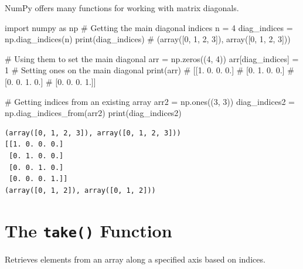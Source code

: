 \documentclass[
  english,
  letterpaper,
  DIV=11,
  numbers=noendperiod]{scrreprt}
\newenvironment{Shaded}{\begin{snugshade}}{\end{snugshade}}
\newcommand{\BuiltInTok}[1]{\textcolor[rgb]{0.00,0.23,0.31}{#1}}
\newcommand{\CommentTok}[1]{\textcolor[rgb]{0.37,0.37,0.37}{#1}}
\newcommand{\DecValTok}[1]{\textcolor[rgb]{0.68,0.00,0.00}{#1}}
\newcommand{\ImportTok}[1]{\textcolor[rgb]{0.00,0.46,0.62}{#1}}
\newcommand{\NormalTok}[1]{\textcolor[rgb]{0.00,0.23,0.31}{#1}}
\newcommand{\OperatorTok}[1]{\textcolor[rgb]{0.37,0.37,0.37}{#1}}
\begin{document}
NumPy offers many functions for working with matrix diagonals.

\begin{Shaded}
\begin{Highlighting}[]
\ImportTok{import}\NormalTok{ numpy }\ImportTok{as}\NormalTok{ np}
\CommentTok{\# Getting the main diagonal indices}
\NormalTok{n }\OperatorTok{=} \DecValTok{4}
\NormalTok{diag\_indices }\OperatorTok{=}\NormalTok{ np.diag\_indices(n)}
\BuiltInTok{print}\NormalTok{(diag\_indices)  }\CommentTok{\# (array([0, 1, 2, 3]), array([0, 1, 2, 3]))}

\CommentTok{\# Using them to set the main diagonal}
\NormalTok{arr }\OperatorTok{=}\NormalTok{ np.zeros((}\DecValTok{4}\NormalTok{, }\DecValTok{4}\NormalTok{))}
\NormalTok{arr[diag\_indices] }\OperatorTok{=} \DecValTok{1}  \CommentTok{\# Setting ones on the main diagonal}
\BuiltInTok{print}\NormalTok{(arr)}
\CommentTok{\# [[1. 0. 0. 0.]}
\CommentTok{\#  [0. 1. 0. 0.]}
\CommentTok{\#  [0. 0. 1. 0.]}
\CommentTok{\#  [0. 0. 0. 1.]]}

\CommentTok{\# Getting indices from an existing array}
\NormalTok{arr2 }\OperatorTok{=}\NormalTok{ np.ones((}\DecValTok{3}\NormalTok{, }\DecValTok{3}\NormalTok{))}
\NormalTok{diag\_indices2 }\OperatorTok{=}\NormalTok{ np.diag\_indices\_from(arr2)}
\BuiltInTok{print}\NormalTok{(diag\_indices2)}
\end{Highlighting}
\end{Shaded}

\begin{verbatim}
(array([0, 1, 2, 3]), array([0, 1, 2, 3]))
[[1. 0. 0. 0.]
 [0. 1. 0. 0.]
 [0. 0. 1. 0.]
 [0. 0. 0. 1.]]
(array([0, 1, 2]), array([0, 1, 2]))
\end{verbatim}

\section{\texorpdfstring{The \texttt{take()}
Function}{The take() Function}}\label{the-take-function}

Retrieves elements from an array along a specified axis based on
indices.
\end{document}
